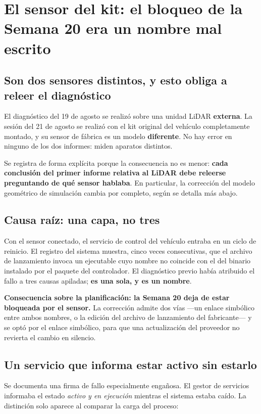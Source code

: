 \documentclass[12pt,letterpaper]{article}
\begin{document}
\section{El sensor del kit: el bloqueo de la Semana 20 era un nombre mal escrito}
\label{sec:lidar}

\subsection{Son dos sensores distintos, y esto obliga a releer el diagnóstico}

El diagnóstico del 19 de agosto se realizó sobre una unidad LiDAR \textbf{externa}. La sesión del 21 de agosto se realizó con el kit original del vehículo completamente montado, y su sensor de fábrica es un modelo \textbf{diferente}. No hay error en ninguno de los dos informes: miden aparatos distintos.

Se registra de forma explícita porque la consecuencia no es menor: \textbf{cada conclusión del primer informe relativa al LiDAR debe releerse preguntando de qué sensor hablaba}. En particular, la corrección del modelo geométrico de simulación cambia por completo, según se detalla más abajo.

\subsection{Causa raíz: una capa, no tres}

Con el sensor conectado, el servicio de control del vehículo entraba en un ciclo de reinicio. El registro del sistema muestra, cinco veces consecutivas, que el archivo de lanzamiento invoca un ejecutable cuyo nombre no coincide con el del binario instalado por el paquete del controlador. El diagnóstico previo había atribuido el fallo a tres causas apiladas; \textbf{es una sola, y es un nombre}.

\textbf{Consecuencia sobre la planificación: la Semana 20 deja de estar bloqueada por el sensor.} La corrección admite dos vías ---un enlace simbólico entre ambos nombres, o la edición del archivo de lanzamiento del fabricante--- y se optó por el enlace simbólico, para que una actualización del proveedor no revierta el cambio en silencio.

\subsection{Un servicio que informa estar activo sin estarlo}

Se documenta una firma de fallo especialmente engañosa. El gestor de servicios informaba el estado \emph{activo y en ejecución} mientras el sistema estaba caído. La distinción solo aparece al comparar la carga del proceso:
\end{document}
